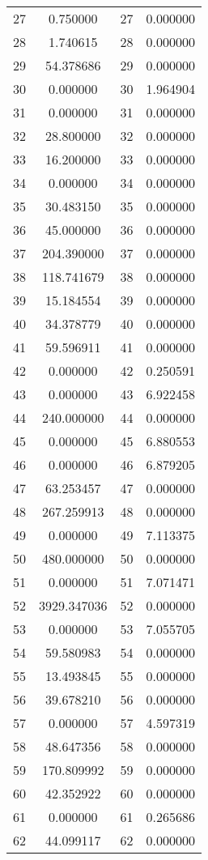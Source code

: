 \documentclass[12pt]{article}
\begin{document}
\begin{longtable}{@{}cccc@{}}
27 & 0.750000 & 27 & 0.000000 \\
28 & 1.740615 & 28 & 0.000000 \\
29 & 54.378686 & 29 & 0.000000 \\
30 & 0.000000 & 30 & 1.964904 \\
31 & 0.000000 & 31 & 0.000000 \\
32 & 28.800000 & 32 & 0.000000 \\
33 & 16.200000 & 33 & 0.000000 \\
34 & 0.000000 & 34 & 0.000000 \\
35 & 30.483150 & 35 & 0.000000 \\
36 & 45.000000 & 36 & 0.000000 \\
37 & 204.390000 & 37 & 0.000000 \\
38 & 118.741679 & 38 & 0.000000 \\
39 & 15.184554 & 39 & 0.000000 \\
40 & 34.378779 & 40 & 0.000000 \\
41 & 59.596911 & 41 & 0.000000 \\
42 & 0.000000 & 42 & 0.250591 \\
43 & 0.000000 & 43 & 6.922458 \\
44 & 240.000000 & 44 & 0.000000 \\
45 & 0.000000 & 45 & 6.880553 \\
46 & 0.000000 & 46 & 6.879205 \\
47 & 63.253457 & 47 & 0.000000 \\
48 & 267.259913 & 48 & 0.000000 \\
49 & 0.000000 & 49 & 7.113375 \\
50 & 480.000000 & 50 & 0.000000 \\
51 & 0.000000 & 51 & 7.071471 \\
52 & 3929.347036 & 52 & 0.000000 \\
53 & 0.000000 & 53 & 7.055705 \\
54 & 59.580983 & 54 & 0.000000 \\
55 & 13.493845 & 55 & 0.000000 \\
56 & 39.678210 & 56 & 0.000000 \\
57 & 0.000000 & 57 & 4.597319 \\
58 & 48.647356 & 58 & 0.000000 \\
59 & 170.809992 & 59 & 0.000000 \\
60 & 42.352922 & 60 & 0.000000 \\
61 & 0.000000 & 61 & 0.265686 \\
62 & 44.099117 & 62 & 0.000000 \\

\end{longtable}
\end{document}

